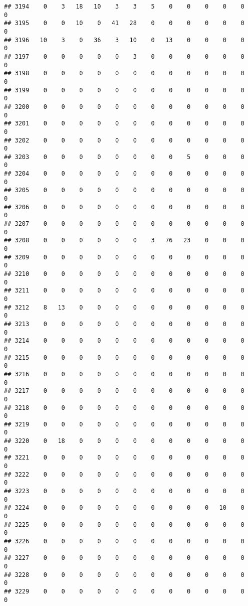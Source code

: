 \documentclass[]{article}
\begin{document}
\begin{verbatim}
## 3194    0    3   18   10    3    3    5    0    0    0    0    0    0
## 3195    0    0   10    0   41   28    0    0    0    0    0    0    0
## 3196   10    3    0   36    3   10    0   13    0    0    0    0    0
## 3197    0    0    0    0    0    3    0    0    0    0    0    0    0
## 3198    0    0    0    0    0    0    0    0    0    0    0    0    0
## 3199    0    0    0    0    0    0    0    0    0    0    0    0    0
## 3200    0    0    0    0    0    0    0    0    0    0    0    0    0
## 3201    0    0    0    0    0    0    0    0    0    0    0    0    0
## 3202    0    0    0    0    0    0    0    0    0    0    0    0    0
## 3203    0    0    0    0    0    0    0    0    5    0    0    0    0
## 3204    0    0    0    0    0    0    0    0    0    0    0    0    0
## 3205    0    0    0    0    0    0    0    0    0    0    0    0    0
## 3206    0    0    0    0    0    0    0    0    0    0    0    0    0
## 3207    0    0    0    0    0    0    0    0    0    0    0    0    0
## 3208    0    0    0    0    0    0    3   76   23    0    0    0    0
## 3209    0    0    0    0    0    0    0    0    0    0    0    0    0
## 3210    0    0    0    0    0    0    0    0    0    0    0    0    0
## 3211    0    0    0    0    0    0    0    0    0    0    0    0    0
## 3212    8   13    0    0    0    0    0    0    0    0    0    0    0
## 3213    0    0    0    0    0    0    0    0    0    0    0    0    0
## 3214    0    0    0    0    0    0    0    0    0    0    0    0    0
## 3215    0    0    0    0    0    0    0    0    0    0    0    0    0
## 3216    0    0    0    0    0    0    0    0    0    0    0    0    0
## 3217    0    0    0    0    0    0    0    0    0    0    0    0    0
## 3218    0    0    0    0    0    0    0    0    0    0    0    0    0
## 3219    0    0    0    0    0    0    0    0    0    0    0    0    0
## 3220    0   18    0    0    0    0    0    0    0    0    0    0    0
## 3221    0    0    0    0    0    0    0    0    0    0    0    0    0
## 3222    0    0    0    0    0    0    0    0    0    0    0    0    0
## 3223    0    0    0    0    0    0    0    0    0    0    0    0    0
## 3224    0    0    0    0    0    0    0    0    0    0   10    0    0
## 3225    0    0    0    0    0    0    0    0    0    0    0    0    0
## 3226    0    0    0    0    0    0    0    0    0    0    0    0    0
## 3227    0    0    0    0    0    0    0    0    0    0    0    0    0
## 3228    0    0    0    0    0    0    0    0    0    0    0    0    0
## 3229    0    0    0    0    0    0    0    0    0    0    0    0    0

\end{verbatim}
\end{document}
